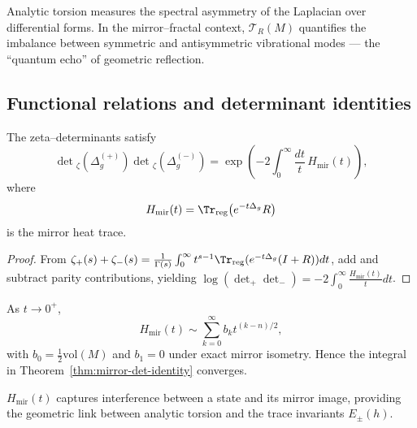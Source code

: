 \begin{remark}
\label{rem:torsion-phys}
Analytic torsion measures the spectral asymmetry of the Laplacian over differential forms.  
In the mirror–fractal context, $\mathcal{T}_R(M)$ quantifies the imbalance between symmetric and antisymmetric vibrational modes — the “quantum echo” of geometric reflection. %
\end{remark}

\subsection{Functional relations and determinant identities}
\label{subsec:ch6-part6-functional-relations} \relax

\begin{theorem}
\label{thm:mirror-det-identity}
The zeta–determinants satisfy
\[
\det{}_{\zeta}(\Delta_g^{(+)})
\det{}_{\zeta}(\Delta_g^{(-)})
=\exp\!\left(-2\int_0^\infty \frac{dt}{t}\,H_{\mathrm{mir}}(t)\right),
\]
where
\[
H_{\mathrm{mir}}(t)
=\Tr_{\mathrm{reg}}\big(e^{-t\Delta_g}R\big)
\]
is the mirror heat trace. %
\end{theorem}

\begin{proof}
From $\zeta_+(s)+\zeta_-(s)=\tfrac{1}{\Gamma(s)}\int_0^\infty t^{s-1}\Tr_{\mathrm{reg}}(e^{-t\Delta_g}(I+R))dt$, add and subtract parity contributions, yielding $\log(\det_+\det_-)= -2\int_0^\infty \tfrac{H_{\mathrm{mir}}(t)}{t}dt$. %
\end{proof}

\begin{lemma}
\label{lem:mirror-heat-asymptotics}
As $t\to0^+$,
\[
H_{\mathrm{mir}}(t)\sim \sum_{k=0}^\infty b_k t^{(k-n)/2},
\]
with $b_0=\tfrac{1}{2}\mathrm{vol}(M)$ and $b_1=0$ under exact mirror isometry.  
Hence the integral in Theorem~\ref{thm:mirror-det-identity} converges. %
\end{lemma}

\begin{remark}
\label{rem:mirror-meaning}
$H_{\mathrm{mir}}(t)$ captures interference between a state and its mirror image, providing the geometric link between analytic torsion and the trace invariants $E_\pm(h)$. %
\end{remark}

